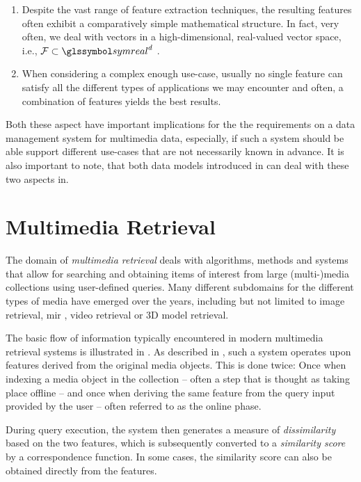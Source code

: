 \begin{enumerate}
    \item Despite the vast range of feature extraction techniques, the resulting features often exhibit a comparatively simple mathematical structure. In fact, very often, we deal with vectors in a high-dimensional, real-valued vector space, i.e., $\mathcal{F} \subset \symreal^d$ \cite{Zezula:2006similarity}. 
    \item When considering a complex enough use-case, usually no single feature can satisfy all the different types of applications we may encounter and often, a combination of features yields the best results\cite{Deselaers:2008Features}.
\end{enumerate}

Both these aspect have important implications for the the requirements on a data management system for multimedia data, especially, if such a system should be able support different use-cases that are not necessarily known in advance. It is also important to note, that both data models introduced in  can deal with these two aspects in.

\section{Multimedia Retrieval}

The domain of \emph{multimedia retrieval} deals with algorithms, methods and systems that allow for searching and obtaining items of interest from large (multi-)media collections using user-defined queries. Many different subdomains for the different types of media have emerged over the years, including but not limited to image retrieval, \acrfull{mir} \cite{Simonetta:2019Multimodal}, video retrieval or 3D model retrieval.

The basic flow of information typically encountered in modern multimedia retrieval systems is illustrated in . As described in , such a system operates upon features derived from the original media objects. This is done twice: Once when indexing a media object in the collection -- often a step that is thought as taking place offline -- and once when deriving the same feature from the query input provided by the user -- often referred to as the online phase.

During query execution, the system then generates a measure of \emph{dissimilarity} based on the two features, which is subsequently converted to a \emph{similarity score} by a correspondence function. In some cases, the similarity score can also be obtained directly from the features.

